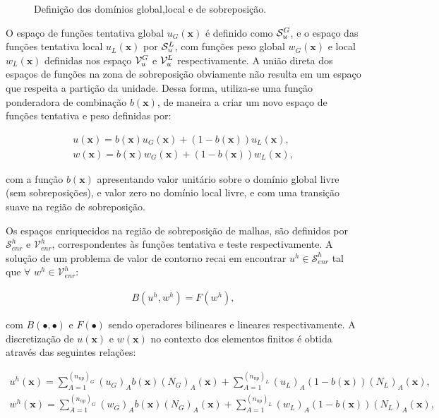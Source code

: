 \documentclass[tese_patricia]{subfiles}
\begin{document}
\begin{figure}[!htb]
	\caption{Definição dos domínios global,local e de sobreposição. }
	\label{fig:domains}
\end{figure}

O espa\c{c}o de fun\c{c}\~oes tentativa global $u_{G}(\mathbf{x})$ \'e definido como $\mathcal{S}_u^{G}$, e o espa\c{c}o das fun\c{c}\~oes tentativa local $u_{L}(\mathbf{x})$ por $\mathcal{S}_u^{L}$, com funções peso global $w_{G}(\mathbf{x})$ e local $w_{L}(\mathbf{x})$ definidas nos espa\c{c}o $\mathcal{V}_u^{G}$ e $\mathcal{V}_u^{L}$ respectivamente. A uni\~ao direta dos espaços de funções na zona de sobreposição obviamente não resulta em um espaço que respeita a partição da unidade. 
Dessa forma, utiliza-se uma fun\c{c}\~ao ponderadora de combinação $b(\mathbf{x})$, de maneira a criar um novo espaço de funções tentativa e peso definidas por:

\begin{align}
u(\mathbf{x}) = b(\mathbf{x})u_{G}(\mathbf{x}) + (1-b(\mathbf{x}))u_{L}(\mathbf{x}),\\
w(\mathbf{x}) = b(\mathbf{x})w_{G}(\mathbf{x}) + (1-b(\mathbf{x}))w_{L}(\mathbf{x}),
\end{align}

\noindent com a função $b(\mathbf{x})$ apresentando valor unitário sobre o domínio global livre (sem sobreposições), e valor zero no domínio local livre, e com uma transição suave na região de sobreposição. 

Os espaços enriquecidos na região de sobreposição de malhas, s\~ao definidos por $\mathcal{S}_{enr}^{h}$ e $\mathcal{V}_{enr}^{h}$, correspondentes às fun\c{c}\~oes tentativa e teste respectivamente. A solu\c{c}\~ao de um problema de valor de contorno recai em encontrar $u^{h} \in \mathcal{S}_{enr}^{h}$ tal que $\forall$ $ w^{h} \in \mathcal{V}_{enr}^{h}$: 

\begin{align}
B(u^{h},w^{h}) = F(w^{h}),
\end{align}

\noindent com $B(\bullet,\bullet)$ e $F(\bullet)$ sendo operadores bilineares e lineares respectivamente. A discretiza\c{c}\~ao de $u(\mathbf{x})$ e $w(\mathbf{x})$ no contexto dos elementos finitos \'e obtida atrav\'es das seguintes rela\c{c}\~oes:

\begin{align}
u^{h}(\mathbf{x}) = \sum_{A = 1}^{(n_{np})_G} (u_{G})_{A}b(\mathbf{x})(N_{G})_{A}(\mathbf{x}) + \sum_{A = 1}^{(n_{np})_L} (u_{L})_{A}(1-b(\mathbf{x}))(N_{L})_{A}(\mathbf{x}),\\
w^{h}(\mathbf{x}) = \sum_{A = 1}^{(n_{np})_G} (w_{G})_{A}b(\mathbf{x})(N_{G})_{A}(\mathbf{x}) + \sum_{A = 1}^{(n_{np})_L} (w_{L})_{A}(1-b(\mathbf{x}))(N_{L})_{A}(\mathbf{x}),
\end{align}
\end{document}

